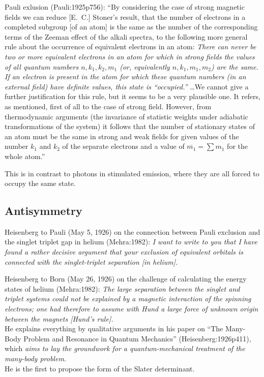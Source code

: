 Pauli exlusion (Pauli:1925p756):
``By considering the case of strong magnetic fields we can reduce [E.~C.]
Stoner's result, that the number of electrons in a completed subgroup [of an
atom] is the same as the number of the corresponding terms of the Zeeman effect
of the alkali spectra, to the following more general rule about the occurrence
of equivalent electrons in an atom:
{\itshape
    There can never be two or more equivalent electrons in an atom for which in
    strong fields the values of all quantum numbers \(n, k_1, k_2, m_1\) (or,
    equivalently \(n, k_1, m_1, m_2\)) are  the same.
    If an electron is present in the atom for which these quantum numbers (in an
    external field) have definite values, this state is ``occupied.''%
}
\dots We cannot give a further justification for this rule, but it seems to be a
very plausible one.
It refers, as mentioned, first of all to the case of strong field.
However, from thermodynamic arguments (the invariance of statistic weights under
adiabatic transformations of the system) it follows that the number of
stationary states of an atom must be the same in strong and weak fields for
given values of the number \(k_1\) and \(k_2\) of the separate electrons and a
value of \(\overline{m_1}=\sum m_1\) for the whole atom.''

This is in contrast to photons in stimulated emission, where they are all forced
to occupy the same state.

\subsection{Antisymmetry}

Heisenberg to Pauli (May 5, 1926) on the connection between Pauli exclusion and
the singlet triplet gap in helium (Mehra:1982):
{\itshape
    I want to write to you that I have found a rather decisive argument that
    your exclusion of equivalent orbitals is connected with the singlet-triplet
    separation [in helium].
}

Heisenberg to Born (May 26, 1926) on the challenge of calculating the energy
states of helium (Mehra:1982):
{\itshape
    The large separation between the singlet and triplet systems could not be
    explained by a magnetic interaction of the spinning electrons; one had
    therefore to assume with Hund a large force of unknown origin between the
    magnets [Hund's rule].
}
\\
He explains everything by qualitative arguments in his paper on ``The Many-Body
Problem and Resonance in Quantum Mechanics'' (Heisenberg:1926p411), which
{\itshape
    aims to lay the groundwork for a quantum-mechanical treatment of the
    many-body problem.
}
\\
He is the first to propose the form of the Slater determinant.



